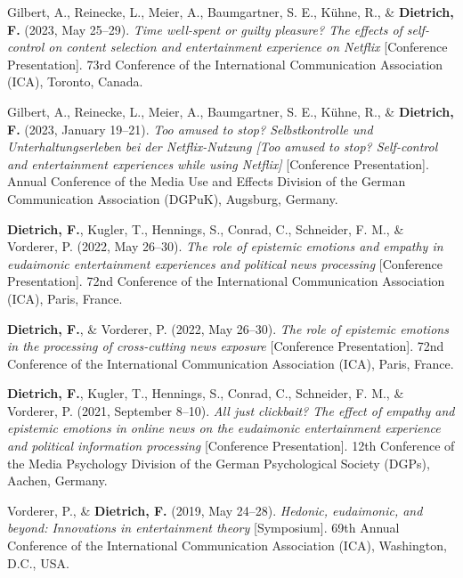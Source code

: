 \documentclass[11pt,a4paper,]{awesome-cv}
\newlength{\cslhangindent}
\newenvironment{CSLReferences}[2] %
 {\begin{list}{}{%
  \setlength{\itemindent}{0pt}
  \setlength{\leftmargin}{0pt}
  \setlength{\parsep}{0pt}
  \ifodd #1
   \setlength{\leftmargin}{\cslhangindent}
   \setlength{\itemindent}{-1\cslhangindent}
  \fi
  \setlength{\itemsep}{#2\baselineskip}}}
 {\end{list}}
\begin{document}
\begin{CSLReferences}{1}{0}
Gilbert, A., Reinecke, L., Meier, A., Baumgartner, S. E., Kühne, R., \&
\textbf{Dietrich, F.} (2023, May 25--29). \emph{Time well-spent or
guilty pleasure? The effects of self-control on content selection and
entertainment experience on Netflix} {[}Conference Presentation{]}. 73rd
Conference of the International Communication Association (ICA),
Toronto, Canada.

Gilbert, A., Reinecke, L., Meier, A., Baumgartner, S. E., Kühne, R., \&
\textbf{Dietrich, F.} (2023, January 19--21). \emph{Too amused to stop?
Selbstkontrolle und Unterhaltungserleben bei der Netflix-Nutzung {[}Too
amused to stop? Self-control and entertainment experiences while using
Netflix{]}} {[}Conference Presentation{]}. Annual Conference of the
Media Use and Effects Division of the German Communication Association
(DGPuK), Augsburg, Germany.

\textbf{Dietrich, F.}, Kugler, T., Hennings, S., Conrad, C., Schneider,
F. M., \& Vorderer, P. (2022, May 26--30). \emph{The role of epistemic
emotions and empathy in eudaimonic entertainment experiences and
political news processing} {[}Conference Presentation{]}. 72nd
Conference of the International Communication Association (ICA), Paris,
France.

\textbf{Dietrich, F.}, \& Vorderer, P. (2022, May 26--30). \emph{The
role of epistemic emotions in the processing of cross-cutting news
exposure} {[}Conference Presentation{]}. 72nd Conference of the
International Communication Association (ICA), Paris, France.

\textbf{Dietrich, F.}, Kugler, T., Hennings, S., Conrad, C., Schneider,
F. M., \& Vorderer, P. (2021, September 8--10). \emph{All just
clickbait? The effect of empathy and epistemic emotions in online news
on the eudaimonic entertainment experience and political information
processing} {[}Conference Presentation{]}. 12th Conference of the Media
Psychology Division of the German Psychological Society (DGPs), Aachen,
Germany.

Vorderer, P., \& \textbf{Dietrich, F.} (2019, May 24--28).
\emph{Hedonic, eudaimonic, and beyond: Innovations in entertainment
theory} {[}Symposium{]}. 69th Annual Conference of the International
Communication Association (ICA), Washington, D.C., USA.


\end{CSLReferences}
\end{document}
